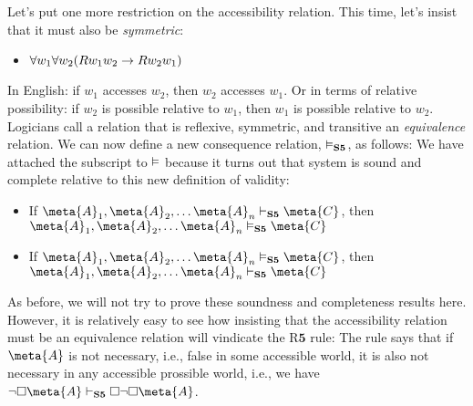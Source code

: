 Let's put one more restriction on the accessibility relation. This time, let's insist that it must also be \emph{symmetric}:
\begin{itemize}
	\item $\forall w_1\forall w_2(Rw_1w_2 \rightarrow Rw_2w_1)$
\end{itemize}
In English: if $w_1$ accesses $w_2$, then $w_2$ accesses $w_1$. Or in terms of relative possibility: if $w_2$ is possible relative to $w_1$, then $w_1$ is possible relative to $w_2$. Logicians call a relation that is reflexive, symmetric, and transitive an \emph{equivalence} relation. We can now define a new consequence relation, $\vDash_{\mathbf{S5}} $, as follows:
We have attached the \mlSfive{} subscript to $\vDash$ because it turns out that system \mlSfive{} is sound and complete relative to this new definition of validity:
\begin{itemize}
	\item If $\meta{A}_1,\meta{A}_2, \dots \meta{A}_n\proves_\mlSfive \meta{C}$, then $\meta{A}_1,\meta{A}_2, \dots \meta{A}_n\entails_\mlSfive \meta{C}$
	\item If $\meta{A}_1,\meta{A}_2, \dots \meta{A}_n\entails_\mlSfive \meta{C}$, then $\meta{A}_1,\meta{A}_2, \dots \meta{A}_n\proves_\mlSfive \meta{C}$
\end{itemize}
As before, we will not try to prove these soundness and completeness results here. However, it is relatively easy to see how insisting that the accessibility relation must be an equivalence relation will vindicate the R$\mathbf{5}$ rule:
The rule says that if $\meta{A}$ is not necessary, i.e., false in some accessible world, it is also not necessary in any accessible prossible world, i.e., we have $\enot\ebox \meta{A} \proves_\mlSfive  \ebox\enot\ebox \meta{A}$.

